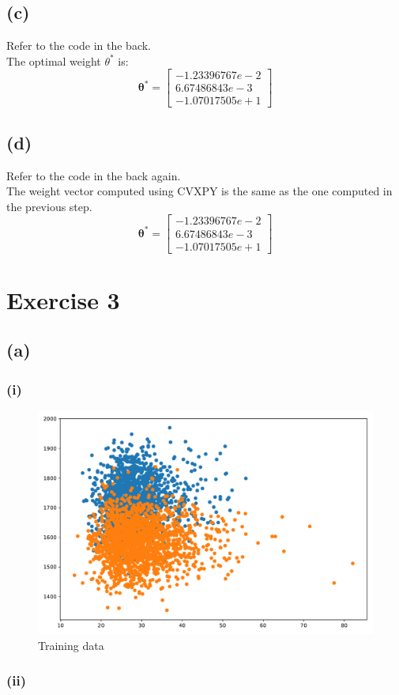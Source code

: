 \documentclass[11pt]{article}
\begin{document}
\subsection*{(c)}
Refer to the code in the back.\\
The optimal weight $\theta^*$ is:\\
$$\pmb{\theta}^* = \begin{bmatrix}
-1.23396767e-2\\
6.67486843e-3\\
-1.07017505e+1
\end{bmatrix}$$

\subsection*{(d)}
Refer to the code in the back again.\\
The weight vector computed using CVXPY is the same as
the one computed in the previous step.\\
$$\pmb{\theta}^* = \begin{bmatrix}
-1.23396767e-2\\
6.67486843e-3\\
-1.07017505e+1
\end{bmatrix}$$
\section*{Exercise 3}

\subsection*{(a)}
\subsubsection*{(i)}
\begin{figure}[h]
	\centering
	\includegraphics[width=0.5\linewidth]{exercise3_1}
	\caption{Training data}
\end{figure}
\subsubsection*{(ii)}
\end{document}
